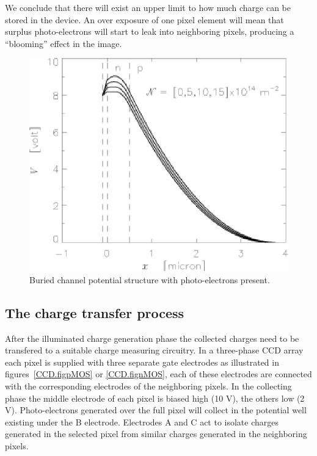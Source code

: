\documentclass{article}
\begin{document}
We conclude that there will exist an upper limit to how much charge
can be stored in the device. An over exposure of one pixel element
will mean that surplus photo-electrons will start to leak into
neighboring pixels, producing a ``blooming'' effect in the image.


\begin{figure}[h]
  \centering
	\includegraphics{CCD_burchanph.eps}
  \caption{Buried channel potential structure with photo-electrons present.}
  \label{CCD.figburchanph}
\end{figure}




\subsection*{The charge transfer process} 

After the illuminated charge generation phase the collected charges
need to be transfered to a suitable charge measuring circuitry. In a
three-phase CCD array each pixel is supplied with three separate gate
electrodes as illustrated in figures~\ref{CCD.figpMOS} or
\ref{CCD.fignMOS}, each of these electrodes are connected with the
corresponding electrodes of the neighboring pixels.  In the
collecting phase the middle electrode of each pixel is biased high (10
V), the others low (2 V). Photo-electrons generated over the full pixel
will collect in the potential well existing under the B electrode.
Electrodes A and C act to isolate charges generated in the selected
pixel from similar charges generated in the neighboring pixels.
\end{document}
